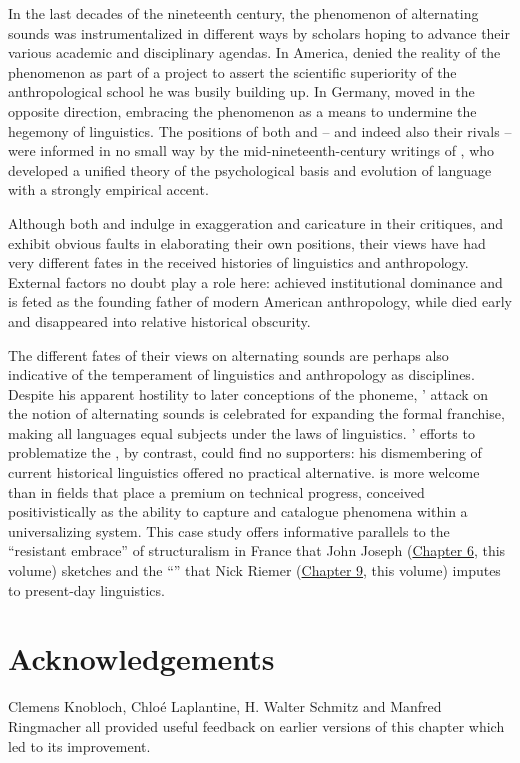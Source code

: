 \documentclass[output=paper]{langscibook}
\begin{document}
In the last decades of the nineteenth century, the phenomenon of alternating sounds was instrumentalized in different ways by scholars hoping to advance their various academic and disciplinary agendas. In America, {\Boas} denied the reality of the phenomenon as part of a project to assert the scientific superiority of the anthropological school he was busily building up. In Germany, {\Gabelentz} moved in the opposite direction, embracing the phenomenon as a means to undermine the hegemony of {\Neogrammarian} linguistics. The positions of both {\Boas} and {\Gabelentz} -- and indeed also their rivals -- were informed in no small way by the mid-nineteenth-century writings of {\Steinthal}, who developed a unified theory of the psychological basis and evolution of language with a strongly empirical accent.

Although both {\Boas} and {\Gabelentz} indulge in exaggeration and caricature in their critiques, and exhibit obvious faults in elaborating their own positions, their views have had very different fates in the received histories of linguistics and anthropology. External factors no doubt play a role here: {\Boas} achieved institutional dominance and is feted as the founding father of modern American anthropology, while {\Gabelentz} died early and disappeared into relative historical obscurity. 

The different fates of their views on alternating sounds are perhaps also indicative of the temperament of linguistics and anthropology as disciplines. Despite his apparent hostility to later conceptions of the phoneme, {\Boas}' attack on the notion of alternating sounds is celebrated for expanding the formal franchise, making all languages equal subjects under the laws of linguistics. {\Gabelentz}' efforts to problematize the , by contrast, could find no supporters: his dismembering of current historical linguistics offered no practical alternative. {\Boas} is more welcome than {\Gabelentz} in fields that place a premium on technical progress, conceived positivistically as the ability to capture and catalogue phenomena within a universalizing system. This case study offers informative parallels to the ``resistant embrace'' of structuralism in France that John Joseph (\hyperref[chap:joseph]{Chapter 6}, this volume) sketches and the ``'' that Nick Riemer (\hyperref[chap:riemer]{Chapter 9}, this volume) imputes to present-day linguistics.

\section*{Acknowledgements}

Clemens Knobloch, 
Chloé Laplantine, 
H. Walter Schmitz 
and 
Manfred Ringma\-cher
all provided useful feedback on earlier versions of this chapter which led to its improvement.

\sloppy
\printbibliography[heading=subbibliography,notkeyword=this]
\end{document}
